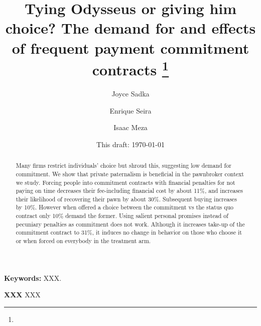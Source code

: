\documentclass[11pt]{article}
\begin{document}
\title{Tying Odysseus or giving him choice? The demand for and effects of frequent payment commitment contracts \thanks{}}
\author{Joyce Sadka \and Enrique Seira \and Isaac Meza }
\date{This draft:  \today \\[2 cm]}



\maketitle
\begin{abstract}

Many firms restrict individuals' choice but shroud this, suggesting low demand for commitment. We show that private paternalism is beneficial in the pawnbroker context we study. Forcing people into commitment contracts with financial penalties for not paying on time decreases their fee-including financial cost by about 11\%, and increases their likelihood of recovering their pawn by about 30\%. Subsequent buying increases by 10\%. However when offered a choice between the commitment vs the status quo contract only 10\% demand the former. Using salient personal promises instead of pecuniary penalties as commitment does not work. Although it increases take-up of the commitment contract to 31\%, it induces no change in behavior on those who choose it or when forced on everybody in the treatment arm.


\end{abstract}



\textbf{Keywords: } XXX.

\textbf{XXX} XXX

\newpage
\end{document}
